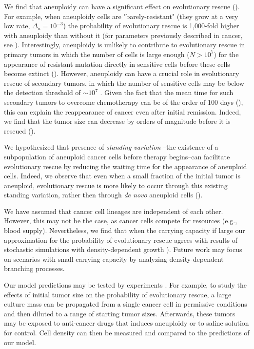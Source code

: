\documentclass[12pt]{extarticle}
\begin{document}
We find that aneuploidy can have a significant effect on evolutionary rescue (). For example, when aneuploidy cells are "barely-resistant" (they grow at a very low rate, $\Delta_a=10^{-3}$) the probability of evolutionary rescue is 1,000-fold higher with aneuploidy than without it (for parameters previously described in cancer, see ).
Interestingly, aneuploidy is unlikely to contribute to evolutionary rescue in primary tumors in which the number of cells is large enough ($N>10^7$) for the appearance of resistant mutation directly in sensitive cells before these cells become extinct ().
However, aneuploidy can have a crucial role in evolutionary rescue of secondary tumors, in which the number of sensitive cells may be below the detection threshold of $\sim10^7$  \citep{bozic2013evolutionary}.
Given the fact that the mean time for such secondary tumors to overcome chemotherapy can be of the order of 100 days (), %
this can explain the reappearance of cancer even after initial remission.
Indeed, we find that the tumor size can decrease by orders of magnitude before it is rescued ().

We hypothesized that presence of \emph{standing variation} %
--the existence of a subpopulation of aneuploid cancer cells before therapy begins--can facilitate evolutionary rescue by reducing the waiting time for the appearance of aneuploid cells. Indeed, we observe that even when a small fraction of the initial tumor is aneuploid, evolutionary rescue is more likely to occur through this existing standing variation, rather then through \emph{de novo} aneuploid cells ().

We have assumed that cancer cell lineages are independent of each other. However, this may not be the case, as cancer cells compete for resources (e.g., blood supply). Nevertheless, we find that when the carrying capacity if large %
our approximation for the probability of evolutionary rescue agrees with results of stochastic simulations with density-dependent growth  ).
Future work may focus on scenarios with small carrying capacity by analyzing density-dependent branching processes. %

Our model predictions may be tested by experiments \citep{martin2013probability}. For example, to study the effects of initial tumor size on the probability of evolutionary rescue, a large culture mass can be propagated from a single cancer cell in permissive conditions and then diluted to a  range of starting tumor sizes. Afterwards, these tumors may be exposed to anti-cancer drugs that induces aneuploidy %
or to saline solution for control. 
Cell density can then be measured and compared to the predictions of our model. %
\end{document}

